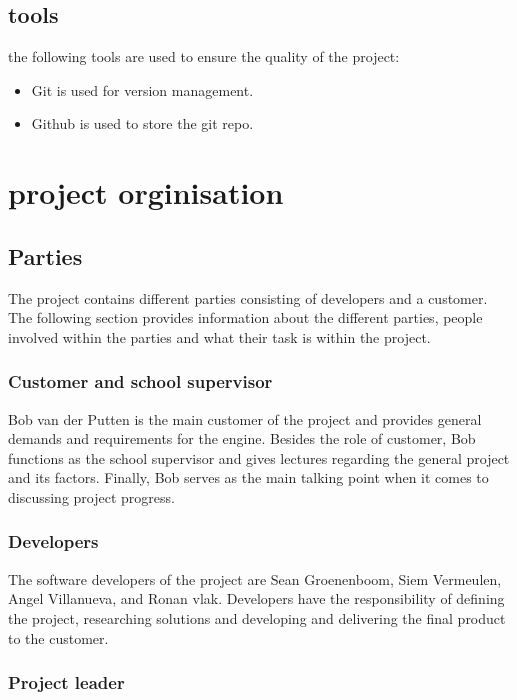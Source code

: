 \documentclass{article} %
\begin{document}
\subsection{tools}
the following tools are used to ensure the quality of the project:
\begin{itemize}
    \item Git is used for version management.
    \item Github is used to store the git repo.
\end{itemize}
\newpage

    \section{project orginisation}
    
    \subsection{Parties}
    The project contains different parties consisting of developers and a customer. The following section provides information about the different parties, people involved within the parties and what their task is within the project.
    \subsubsection{Customer and school supervisor}
    
    Bob van der Putten is the main customer of the project and provides general demands and requirements for the engine. Besides the role of customer, Bob functions as the school supervisor and gives lectures regarding the general project and its factors. Finally, Bob  serves as the main talking point when it comes to discussing project progress.
    
   	\subsubsection{Developers}
    
    The software developers of the project are Sean Groenenboom, Siem Vermeulen, Angel Villanueva, and Ronan vlak. Developers have the responsibility of defining the project, researching solutions and developing and delivering the final product to the customer.
    
    
    \subsubsection{Project leader}
    
\end{document}
